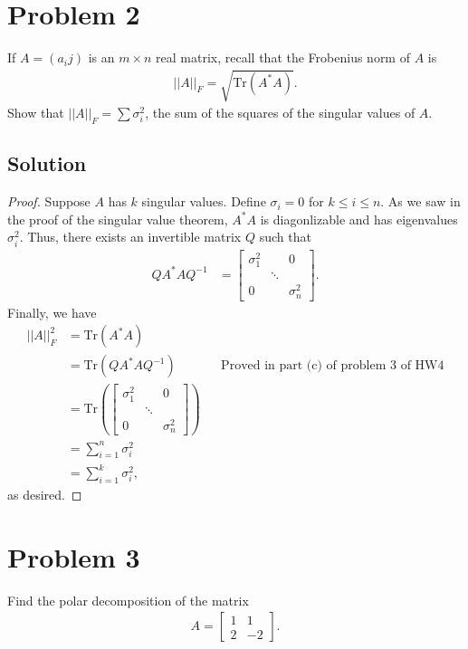 \documentclass[10pt,a4paper]{article}
\theoremstyle{definition}
\begin{document}
\section*{Problem 2}
If $A = (a_ij)$ is an $m\times n$ real matrix, recall that the Frobenius norm of $A$ is
\begin{align*}
||A||_F = \sqrt{\text{Tr}(A^*A)}.
\end{align*}
Show that $||A||_F = \sum \sigma_i^2$, the sum of the squares of the singular values of $A$.

\subsection*{Solution}
\begin{proof}
Suppose $A$ has $k$ singular values. Define $\sigma_i = 0$ for $k \leq i \leq n$. As we saw in the proof of the singular value theorem, $A^* A$ is diagonlizable and has eigenvalues $\sigma_i^2$. Thus, there exists an invertible matrix $Q$ such that 
\begin{align*}
Q A^* A Q^{-1} &= \begin{bmatrix}
    \sigma_1^2 & & 0 \\
    & \ddots & \\
    0& & \sigma_n^2
  \end{bmatrix}.
\end{align*}
Finally, we have 
\begin{align*}
||A||^2_F &= \text{Tr}(A^*A)\\
&= \text{Tr}(Q A^* A Q^{-1}) && \text{Proved in part (c) of problem 3 of HW4}\\
&= \text{Tr} \left(\begin{bmatrix}
    \sigma_1^2 & & 0 \\
    & \ddots & \\
    0& & \sigma_n^2
  \end{bmatrix} \right)\\
&= \sum_{i=1}^n \sigma_i^2\\
&= \sum_{i=1}^k \sigma_i^2,
\end{align*}
as desired.
\end{proof}

\section*{Problem 3}
Find the polar decomposition of the matrix 
\begin{align*}
A = \begin{bmatrix}
1 & 1\\
2 & -2
\end{bmatrix}.
\end{align*}
\end{document}
